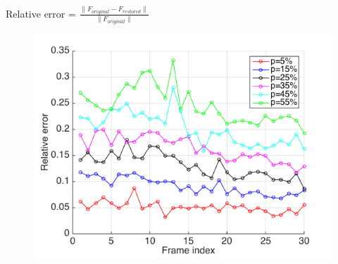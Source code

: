 \documentclass{beamer}
\begin{document}
\begin{frame}
Relative error = $\frac{\| F_{original}-F_{restored} \|}{\|F_{original} \|}$
\begin{figure}
\includegraphics[width=0.7\linewidth]{pEffectPlot}
\end{figure}
\end{frame}
\end{document}
